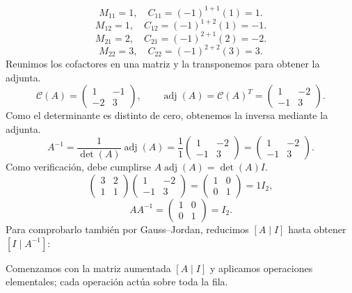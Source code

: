 \documentclass[12pt]{article}
\theoremstyle{remark}
\newcommand{\adj}{\operatorname{adj}}
\begin{document}
\[
M_{11}=1,\quad C_{11}=(-1)^{1+1}(1)=1.
\]
\[
M_{12}=1,\quad C_{12}=(-1)^{1+2}(1)=-1.
\]
\[
M_{21}=2,\quad C_{21}=(-1)^{2+1}(2)=-2.
\]
\[
M_{22}=3,\quad C_{22}=(-1)^{2+2}(3)=3.
\]
Reunimos los cofactores en una matriz y la transponemos para obtener la adjunta.
\[
\mathcal{C}(A)=\begin{pmatrix}1&-1\\-2&3\end{pmatrix},\qquad\adj(A)=\mathcal{C}(A)^T=\begin{pmatrix}1&-2\\-1&3\end{pmatrix}.
\]
Como el determinante es distinto de cero, obtenemos la inversa mediante la adjunta.
\[
A^{-1}=\frac1{\det(A)}\adj(A)=\frac1{1}\begin{pmatrix}1&-2\\-1&3\end{pmatrix}=\begin{pmatrix}1&-2\\-1&3\end{pmatrix}.
\]
Como verificación, debe cumplirse $A\adj(A)=\det(A)I$.
\[
\begin{pmatrix}3&2\\1&1\end{pmatrix}\begin{pmatrix}1&-2\\-1&3\end{pmatrix}=\begin{pmatrix}1&0\\0&1\end{pmatrix}=1I_{2},
\]
\[
AA^{-1}=\begin{pmatrix}1&0\\0&1\end{pmatrix}=I_{2}.
\]
Para comprobarlo también por Gauss--Jordan, reducimos $[A\mid I]$ hasta obtener $[I\mid A^{-1}]$:

Comenzamos con la matriz aumentada $[A\mid I]$ y aplicamos operaciones elementales; cada operación actúa sobre toda la fila.
\end{document}
